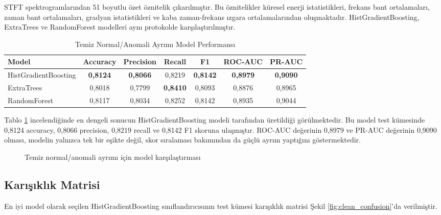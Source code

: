 STFT spektrogramlarından 51 boyutlu özet öznitelik çıkarılmıştır. Bu öznitelikler küresel enerji istatistikleri, frekans bant ortalamaları, zaman bant ortalamaları, gradyan istatistikleri ve kaba zaman-frekans ızgara ortalamalarından oluşmaktadır. HistGradientBoosting, ExtraTrees ve RandomForest modelleri aynı protokolde karşılaştırılmıştır.

\begin{table}[htbp]
\centering
\small
\caption{Temiz Normal/Anomali Ayrımı Model Performansı}
\begin{adjustbox}{center,max width=\textwidth}
\begin{tabularx}{0.96\textwidth}{Xcccccc}
\toprule
\textbf{Model} & \textbf{Accuracy} & \textbf{Precision} & \textbf{Recall} & \textbf{F1} & \textbf{ROC-AUC} & \textbf{PR-AUC} \\
\midrule
HistGradientBoosting & \textbf{0,8124} & \textbf{0,8066} & 0,8219 & \textbf{0,8142} & \textbf{0,8979} & \textbf{0,9090} \\
ExtraTrees & 0,8018 & 0,7799 & \textbf{0,8410} & 0,8093 & 0,8876 & 0,8965 \\
RandomForest & 0,8117 & 0,8034 & 0,8252 & 0,8142 & 0,8935 & 0,9044 \\
\bottomrule
\end{tabularx}
\end{adjustbox}
\label{tab:temiz_model_performans}
\end{table}

Tablo \ref{tab:temiz_model_performans} incelendiğinde en dengeli sonucun HistGradientBoosting modeli tarafından üretildiği görülmektedir. Bu model test kümesinde 0,8124 accuracy, 0,8066 precision, 0,8219 recall ve 0,8142 F1 skoruna ulaşmıştır. ROC-AUC değerinin 0,8979 ve PR-AUC değerinin 0,9090 olması, modelin yalnızca tek bir eşikte değil, skor sıralaması bakımından da güçlü ayrım yaptığını göstermektedir.

\begin{figure}[htbp]
    \centering
    \caption{Temiz normal/anomali ayrımı için model karşılaştırması}
    \label{fig:clean_model_comparison}
\end{figure}

\subsection{Karışıklık Matrisi}

En iyi model olarak seçilen HistGradientBoosting sınıflandırıcısının test kümesi karışıklık matrisi Şekil \ref{fig:clean_confusion}'da verilmiştir.

